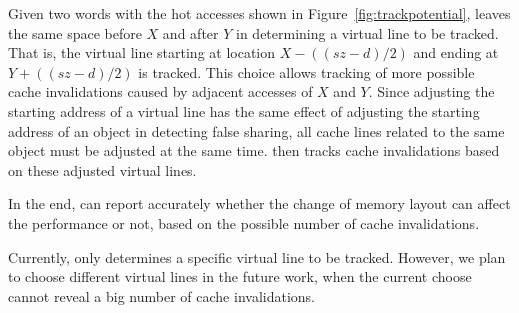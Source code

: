 Given two words with the hot accesses shown in Figure~\ref{fig:trackpotential}, \Predator{} leaves the same space before $X$ and after $Y$ in determining a virtual line to be tracked. That is, the virtual line starting at location $X-((sz-d)/2)$ and ending at $Y+((sz-d)/2)$ is tracked. 
This choice allows tracking of more possible cache invalidations caused by adjacent accesses of $X$ and $Y$. 
Since adjusting the starting address of a virtual line has the same effect of adjusting the starting address of an object in detecting false sharing, all cache lines related to the same object must be adjusted at the same time. \Predator{} then tracks cache invalidations based on these adjusted virtual lines.

In the end, \Predator{} can report accurately whether the change of memory layout can affect the performance or not, based on the possible number of cache invalidations. 

Currently, \predator{} only determines a specific virtual line to be tracked. However, we plan to choose different virtual lines in the future work, when the current choose cannot reveal a big number of cache invalidations. 

